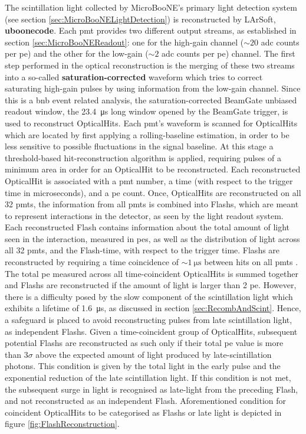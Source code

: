 The scintillation light collected by MicroBooNE's primary light detection system (see section \ref{sec:MicroBooNELightDetection}) is reconstructed by \gls{LArSoft}, \ie \textbf{uboonecode}. Each \gls{pmt} provides two different output streams, as established in section \ref{sec:MicroBooNEReadout}: one for the high-gain channel ($\sim \num{20}$ \gls{adc} counts per \gls{pe}) and the other for the low-gain ($\sim \num{2}$ \gls{adc} counts per \gls{pe}) channel. The first step performed in the optical reconstruction is the merging of these two streams into a so-called \textbf{saturation-corrected} waveform which tries to correct saturating high-gain pulses by using information from the low-gain channel. Since this is a \gls{bnb} event related analysis, the saturation-corrected \gls{BeamGate} unbiased readout window, \ie the \SI{23.4}{\micro\second} long window opened by the \gls{BeamGate} trigger, is used to reconstruct \glspl{OpticalHit}. Each \gls{pmt}'s waveform is scanned for \glspl{OpticalHit} which are located by first applying a rolling-baseline estimation, in order to be less sensitive to possible fluctuations in the signal baseline. At this stage a threshold-based hit-reconstruction algorithm is applied, requiring pulses of a minimum area in order for an \gls{OpticalHit} to be reconstructed. Each reconstructed \gls{OpticalHit} is associated with a \gls{pmt} number, a time (with respect to the trigger time in microseconds), and a \gls{pe} count. Once, \glspl{OpticalHit} are reconstructed on all \num{32} \glspl{pmt}, the information from all \glspl{pmt} is combined into \glspl{Flash}, which are meant to represent interactions in the detector, as seen by the light readout system. Each reconstructed \gls{Flash} contains information about the total amount of light seen in the interaction, measured in \glspl{pe}, as well as the distribution of light across all \num{32} \glspl{pmt}, and the \gls{Flash}-time, with respect to the trigger time. \Glspl{Flash} are reconstructed by requiring a time coincidence of $\sim \SI{1}{\micro\second}$ between hits on all \glspl{pmt} \cite{MicroBooNECCInclIN}. The total \gls{pe} measured across all time-coincident \glspl{OpticalHit} is summed together and \glspl{Flash} are reconstructed if the amount of light is larger than \num{2} \gls{pe}. However, there is a difficulty posed by the slow component of the scintillation light which exhibits a lifetime of \SI{1.6}{\micro\second}, as discussed in section \ref{sec:RecombAndScint}. Hence, a safeguard is placed to avoid reconstructing pulses from late scintillation light, as independent \glspl{Flash}. Given a time-coincident group of \glspl{OpticalHit}, subsequent potential \glspl{Flash} are reconstructed as such only if their total \gls{pe} value is more than $\num{3}\sigma$ above the expected amount of light produced by late-scintillation photons. This condition is given by the total light in the early pulse and the exponential reduction of the late scintillation light. If this condition is not met, the subsequent surge in light is recognised as late-light from the preceding \gls{Flash}, and not reconstructed as an independent \gls{Flash}. Aforementioned condition for coincident \glspl{OpticalHit} to be categorised as \glspl{Flash} or late light is depicted in figure \ref{fig:FlashReconstruction}.
